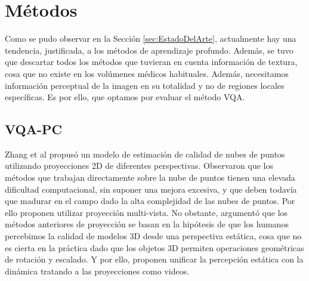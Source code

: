 \section{Métodos}
Como se pudo observar en la Sección \ref{sec:EstadoDelArte}, actualmente hay una 
tendencia, justificada, a los métodos de aprendizaje profundo. Además, se tuvo 
que descartar todos los métodos que tuvieran en cuenta información de textura, 
cosa que no existe en los volúmenes médicos habituales. Además, necesitamos 
información perceptual de la imagen en su totalidad y no de regiones locales 
específicas. Es por ello, que optamos por evaluar el método VQA\cite{VQA-PC}.

\subsection{VQA-PC}
Zhang et al\cite{VQA-PC} propusó un modelo de estimación de calidad de nubes 
de puntos utilizando proyecciones 2D de diferentes perspectivas. 
Observaron que los métodos que trabajan directamente sobre la nube de puntos tienen
una elevada dificultad computacional, sin suponer una mejora excesiva, y que 
deben todavía que madurar en el campo dado la alta complejidad de las nubes de puntos.
Por ello proponen utilizar proyección multi-vista. No obstante, argumentó que 
los métodos anteriores de proyección se basan en la hipótesis de que los humanos 
percebimos la calidad de modelos 3D desde una perspectiva estática, cosa que no 
es cierta en la práctica dado que los objetos 3D permiten operaciones geométricas 
de rotación y escalado.
Y por ello, proponen unificar la percepción estática con la dinámica tratando 
a las proyecciones como videos.

